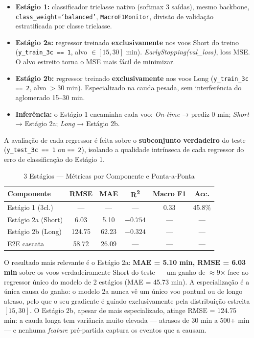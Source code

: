 \documentclass[conference]{IEEEtran}
\begin{document}
\begin{itemize}
\item \textbf{Estágio 1:} classificador triclasse nativo (softmax 3 saídas),
      mesmo backbone, \texttt{class\_weight=`balanced'}, \texttt{MacroF1Monitor},
      divisão de validação estratificada por classe triclasse.
\item \textbf{Estágio 2a:} regressor treinado \textbf{exclusivamente} nos voos
      Short do treino (\texttt{y\_train\_3c == 1}, alvo $\in [15,30]$ min).
      \textit{EarlyStopping(val\_loss)}, loss MSE. O alvo estreito torna o MSE
      mais fácil de minimizar.
\item \textbf{Estágio 2b:} regressor treinado \textbf{exclusivamente} nos voos
      Long (\texttt{y\_train\_3c == 2}, alvo $> 30$ min). Especializado na cauda
      pesada, sem interferência do aglomerado 15–30 min.
\item \textbf{Inferência:} o Estágio 1 encaminha cada voo: \textit{On-time} →
      prediz 0 min; \textit{Short} → Estágio 2a; \textit{Long} → Estágio 2b.
\end{itemize}

A avaliação de cada regressor é feita sobre o \textbf{subconjunto verdadeiro}
do teste (\texttt{y\_test\_3c == 1} ou \texttt{== 2}), isolando a qualidade
intrínseca de cada regressor do erro de classificação do Estágio 1.

\begin{table}[h]
\centering
\caption{3 Estágios — Métricas por Componente e Ponta-a-Ponta}
\label{tab:three_stage}
\setlength{\tabcolsep}{3pt}
\begin{tabular}{p{2.4cm}ccccc}
\toprule
\textbf{Componente} & \textbf{RMSE} & \textbf{MAE} & \textbf{R\textsuperscript{2}} & \textbf{Macro F1} & \textbf{Acc.} \\
\midrule
Estágio 1 (3cl.) & — & — & — & 0.33 & 45.8\% \\
Estágio 2a (Short) & 6.03 & 5.10 & $-0.754$ & — & — \\
Estágio 2b (Long) & 124.75 & 62.23 & $-0.324$ & — & — \\
E2E cascata & 58.72 & 26.09 & — & — & — \\
\bottomrule
\end{tabular}
\end{table}

O resultado mais relevante é o Estágio 2a: \textbf{MAE = 5.10 min, RMSE = 6.03
min} sobre os voos verdadeiramente Short do teste — um ganho de $\approx$9$\times$
face ao regressor único do modelo de 2 estágios (MAE = 45.73 min). A especialização
é a única causa do ganho: o modelo 2a nunca vê um único voo pontual ou de longo
atraso, pelo que o seu gradiente é guiado exclusivamente pela distribuição estreita
$[15,30]$. O Estágio 2b, apesar de mais especializado, atinge RMSE = 124.75 min:
a cauda longa tem variância muito elevada — atrasos de 30 min a 500+ min — e
nenhuma \textit{feature} pré-partida captura os eventos que a causam.
\end{document}

